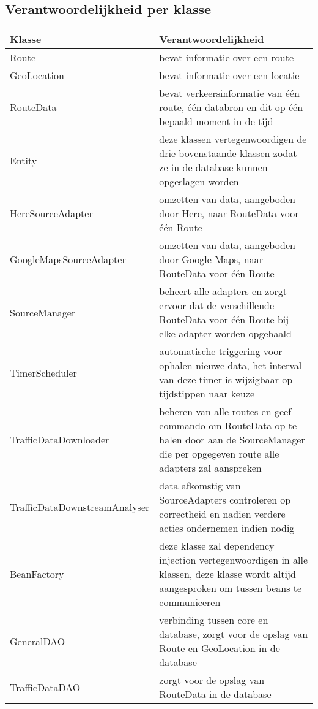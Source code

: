 \documentclass[ps,a4paper,oneside]{report}
\begin{document}
\subsection{Verantwoordelijkheid per klasse}
\begin{tabular}{ | l | p{6.5cm}| }
	\hline
	\textbf{Klasse} & \textbf{Verantwoordelijkheid} \\
	\hline
	Route & bevat informatie over een route \\
	\hline
	GeoLocation & bevat informatie over een locatie \\
	\hline
	RouteData & bevat verkeersinformatie van \'e\'en route, \'e\'en databron en dit op \'e\'en bepaald moment in de tijd \\
	\hline
	[Object]Entity & deze klassen vertegenwoordigen de drie bovenstaande klassen zodat ze in de database kunnen opgeslagen worden\\
	\hline
	HereSourceAdapter & omzetten van data, aangeboden door Here, naar RouteData voor \'e\'en Route\\	
	\hline
	GoogleMapsSourceAdapter & omzetten van data, aangeboden door Google Maps, naar RouteData voor \'e\'en Route\\	
	\hline
	SourceManager & beheert alle adapters en zorgt ervoor dat de verschillende RouteData voor \'e\'en Route bij elke adapter worden opgehaald\\	
	\hline
	TimerScheduler & automatische triggering voor ophalen nieuwe data, het interval van deze timer is wijzigbaar op tijdstippen naar keuze\\	
	\hline
	TrafficDataDownloader & beheren van alle routes en geef commando om RouteData op te halen door aan de SourceManager die per opgegeven route alle adapters zal aanspreken\\	
	\hline
	TrafficDataDownstreamAnalyser & data afkomstig van SourceAdapters controleren op correctheid en nadien verdere acties ondernemen indien nodig\\		
	\hline
	BeanFactory & deze klasse zal dependency injection vertegenwoordigen in alle klassen, deze klasse wordt altijd aangesproken om tussen beans te communiceren \\	
	\hline
	GeneralDAO & verbinding tussen core en database, zorgt voor de opslag van Route en GeoLocation in de database\\	
	\hline
	TrafficDataDAO & zorgt voor de opslag van RouteData in de database\\	
	\hline
\end{tabular}
\end{document}
